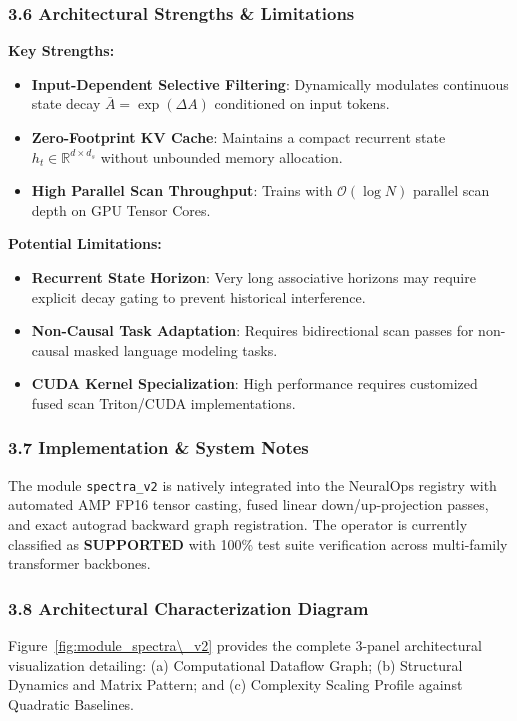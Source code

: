 \subsubsection*{3.6 Architectural Strengths \& Limitations}
\textbf{Key Strengths:}
\begin{itemize}
    \item \textbf{Input-Dependent Selective Filtering}: Dynamically modulates continuous state decay $\bar{A} = \exp(\Delta A)$ conditioned on input tokens.
    \item \textbf{Zero-Footprint KV Cache}: Maintains a compact recurrent state $h_t \in \mathbb{R}^{d \times d_s}$ without unbounded memory allocation.
    \item \textbf{High Parallel Scan Throughput}: Trains with $\mathcal{O}(\log N)$ parallel scan depth on GPU Tensor Cores.
\end{itemize}

\textbf{Potential Limitations:}
\begin{itemize}
    \item \textbf{Recurrent State Horizon}: Very long associative horizons may require explicit decay gating to prevent historical interference.
    \item \textbf{Non-Causal Task Adaptation}: Requires bidirectional scan passes for non-causal masked language modeling tasks.
    \item \textbf{CUDA Kernel Specialization}: High performance requires customized fused scan Triton/CUDA implementations.
\end{itemize}

\subsubsection*{3.7 Implementation \& System Notes}
The module \texttt{spectra\_v2} is natively integrated into the NeuralOps registry with automated AMP FP16 tensor casting, fused linear down/up-projection passes, and exact autograd backward graph registration. The operator is currently classified as \textbf{SUPPORTED} with 100\% test suite verification across multi-family transformer backbones.

\subsubsection*{3.8 Architectural Characterization Diagram}
Figure~\ref{fig:module_spectra\_v2} provides the complete 3-panel architectural visualization detailing: (a) Computational Dataflow Graph; (b) Structural Dynamics and Matrix Pattern; and (c) Complexity Scaling Profile against Quadratic Baselines.

